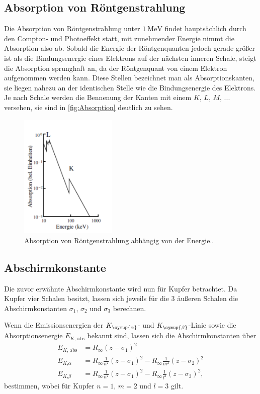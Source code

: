 \subsection{Absorption von Röntgenstrahlung}
\label{sec:Absorption von Röntgenstrahlung}

Die Absorption von Röntgenstrahlung unter $\qty{1}{\mega\electronvolt}$ findet hauptsächlich durch den Compton- und
Photoeffekt statt, mit zunehmender Energie nimmt die Absorption also ab. Sobald die Energie der Röntgenquanten jedoch
gerade größer ist als die Bindungsenergie eines Elektrons auf der nächsten inneren Schale, steigt die Absorption sprunghaft an,
da der Röntgenquant von einem Elektron aufgenommen werden kann.
Diese Stellen bezeichnet man als Absorptionskanten, sie liegen nahezu an der identischen Stelle wie die Bindungsenergie
des Elektrons. Je nach Schale werden die Bennenung der Kanten mit einem $K$, $L$, $M$, ... versehen, sie sind in
\autoref{fig:Absorption} deutlich zu sehen.

\begin{figure}[H]
    \centering
    \includegraphics[height=6cm]{content/pics/absorption.pdf}
    \caption{Absorption von Röntgenstrahlung abhängig von der Energie..\cite{v602}}
    \label{fig:Absorption}
\end{figure}

\subsection{Abschirmkonstante}
\label{sec:Abschirmkonstante}

Die zuvor erwähnte Abschirmkonstante wird nun für Kupfer betrachtet.
Da Kupfer vier Schalen besitzt, lassen sich jeweils für die 3 äußeren Schalen die Abschirmkonstanten
$\sigma_1$, $\sigma_2$ und $\sigma_3$ berechnen.

Wenn die Emissionsenergien der $K_{\symup{\alpha}}$- und $K_{\symup{\beta}}$-Linie sowie die Absorptionsenergie
$E_{K\text{, abs}}$ bekannt sind, lassen sich die Abschirmkonstanten über
\begin{align}
    \label{eqn:Sigma_Kupfer}
    E_{K \text{, abs}} &= R_\infty (z - \sigma_1)^2 \\
    \label{eqn:Sigma_Kupfer2}
    E_{K \text{,} \alpha} &= R_\infty \frac{1}{n^2} (z - \sigma_1)^2 - R_\infty \frac{1}{m^2} (z - \sigma_2)^2 \\
    \label{eqn:Sigma_Kupfer3}
    E_{K \text{,} \beta} &= R_\infty \frac{1}{n^2} (z - \sigma_1)^2 - R_\infty \frac{1}{l^2} (z - \sigma_3)^2, 
\end{align}
bestimmen, wobei für Kupfer $n = 1$, $m = 2$ und $l = 3$ gilt.

